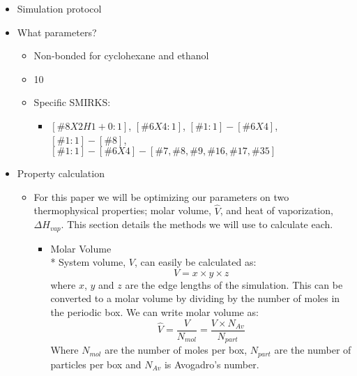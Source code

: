 \documentclass[aps,pre,nofootinbib,superscriptaddress,linenumbers,10pt, draft,tightenlines]{revtex4-1}
\begin{document}
\begin{itemize}
	\item Simulation protocol
	\item What parameters?
	\begin{itemize}
		\item Non-bonded for cyclohexane and ethanol 
		\item 10
		\item Specific SMIRKS:
		\begin{itemize}
			\item $[\#8X2H1+0:1]$, $[\#6X4:1]$, $[\#1:1]-[\#6X4]$, $[\#1:1]-[\#8]$, 
			      $[\#1:1]-[\#6X4]-[\#7,\#8,\#9,\#16,\#17,\#35]$
		\end{itemize}
	\end{itemize}
    \item Property calculation
    \begin{itemize}
        \item For this paper we will be optimizing our parameters on two thermophysical
              properties; molar volume, $\hat{V}$, and heat of 
              vaporization, $\Delta H_{vap}$. This section details the methods we will use to
              calculate each.
        \begin{itemize}
    	    \item Molar Volume \\*
    	    System volume, $V$, can easily be calculated as:
    	    \begin{equation} V = x \times y \times z \end{equation}
    	    where $x$, $y$ and $z$ are the edge lengths of the simulation.
    	    This can be converted to a molar volume by dividing by the number of moles in the     
            periodic box. We can write molar volume as:
    	    \begin{equation} \hat{V} = \frac{V}{N_{mol}} = \frac{V \times N_{Av}}{N_{part}}                   \end{equation}
    	    Where $N_{mol}$ are the number of moles per box, $N_{part}$ are the number of        
            particles per box and $N_{Av}$ 
    	    is Avogadro's number.
    	

\end{itemize}
\end{itemize}
\end{itemize}
\end{document}
